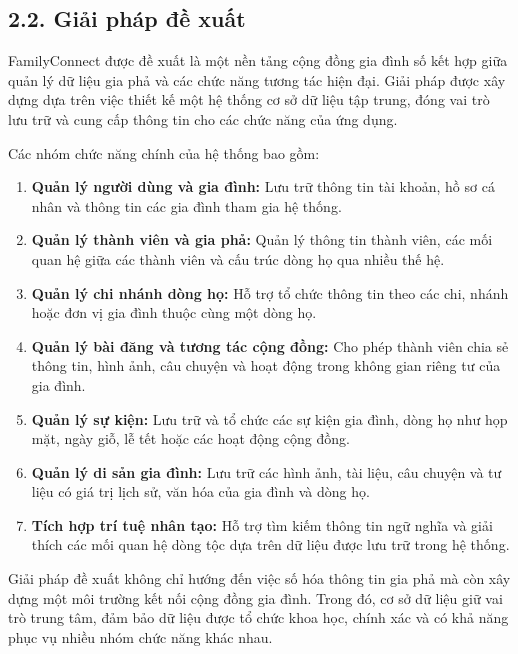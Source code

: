 \subsection*{2.2. Giải pháp đề xuất}
{}

FamilyConnect được đề xuất là một nền tảng cộng đồng gia đình số kết hợp giữa quản lý dữ liệu gia phả và các chức năng tương tác hiện đại. Giải pháp được xây dựng dựa trên việc thiết kế một hệ thống cơ sở dữ liệu tập trung, đóng vai trò lưu trữ và cung cấp thông tin cho các chức năng của ứng dụng.

Các nhóm chức năng chính của hệ thống bao gồm:

\begin{enumerate}[leftmargin=*]
\item \textbf{Quản lý người dùng và gia đình:} Lưu trữ thông tin tài khoản, hồ sơ cá nhân và thông tin các gia đình tham gia hệ thống.
\item \textbf{Quản lý thành viên và gia phả:} Quản lý thông tin thành viên, các mối quan hệ giữa các thành viên và cấu trúc dòng họ qua nhiều thế hệ.
\item \textbf{Quản lý chi nhánh dòng họ:} Hỗ trợ tổ chức thông tin theo các chi, nhánh hoặc đơn vị gia đình thuộc cùng một dòng họ.
\item \textbf{Quản lý bài đăng và tương tác cộng đồng:} Cho phép thành viên chia sẻ thông tin, hình ảnh, câu chuyện và hoạt động trong không gian riêng tư của gia đình.
\item \textbf{Quản lý sự kiện:} Lưu trữ và tổ chức các sự kiện gia đình, dòng họ như họp mặt, ngày giỗ, lễ tết hoặc các hoạt động cộng đồng.
\item \textbf{Quản lý di sản gia đình:} Lưu trữ các hình ảnh, tài liệu, câu chuyện và tư liệu có giá trị lịch sử, văn hóa của gia đình và dòng họ.
\item \textbf{Tích hợp trí tuệ nhân tạo:} Hỗ trợ tìm kiếm thông tin ngữ nghĩa và giải thích các mối quan hệ dòng tộc dựa trên dữ liệu được lưu trữ trong hệ thống.
\end{enumerate}

Giải pháp đề xuất không chỉ hướng đến việc số hóa thông tin gia phả mà còn xây dựng một môi trường kết nối cộng đồng gia đình. Trong đó, cơ sở dữ liệu giữ vai trò trung tâm, đảm bảo dữ liệu được tổ chức khoa học, chính xác và có khả năng phục vụ nhiều nhóm chức năng khác nhau.


